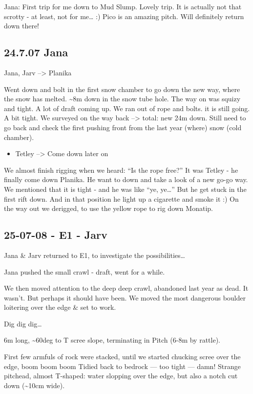 Jana: First trip for me down to Mud Slump. Lovely trip. It is actually
not that scrotty - at least, not for me\ldots{} :) Pico is an amazing
pitch. Will definitely return down there!

\subsection{24.7.07 Jana}\label{jana}

Jana, Jarv --\textgreater{} Planika

Went down and bolt in the first snow chamber to go down the new way,
where the snow has melted. \textasciitilde{}8m down in the snow tube
hole. The way on was squizy and tight. A lot of draft coming up. We ran
out of rope and bolts. it is still going. A bit tight. We surveyed on
the way back --\textgreater{} total: new 24m down. Still need to go back
and check the first pushing front from the last year (where) snow (cold
chamber).

\begin{itemize}
\tightlist
\item
  Tetley --\textgreater{} Come down later on
\end{itemize}

We almost finish rigging when we heard: ``Is the rope free?'' It was
Tetley - he finally come down Planika. He want to down and take a look
of a new go-go way. We mentioned that it is tight - and he was like
``ye, ye\ldots{}'' But he get stuck in the first rift down. And in that
position he light up a cigarette and smoke it :) On the way out we
derigged, to use the yellow rope to rig down Monatip.

\subsection{25-07-08 - E1 - Jarv}\label{e1---jarv}

Jana \& Jarv returned to E1, to investigate the possibilities\ldots{}

Jana pushed the small crawl - draft, went for a while.

We then moved attention to the deep deep crawl, abandoned last year as
dead. It wasn't. But perhaps it should have been. We moved the most
dangerous boulder loitering over the edge \& set to work.

Dig dig dig\ldots{}

6m long, \textasciitilde{}60deg to T scree slope, terminating in Pitch
(6-8m by rattle).

First few armfuls of rock were stacked, until we started chucking scree
over the edge, boom boom boom Tidied back to bedrock --- too tight ---
damn! Strange pitchead, almost T-shaped: water slopping over the edge,
but also a notch cut down (\textasciitilde{}10cm wide).

